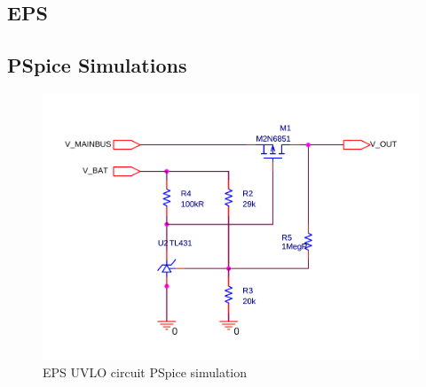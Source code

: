 \begin{appendices}
%
\section{EPS}\label{app:EPS}
%
\subsection{PSpice Simulations}
\label{app:EPS_PSpice}
%
%
\begin{figure}[H]
\centering
\includegraphics[scale=0.4]{figures/fig_CDR_PSpice_UVLO}
\caption{\ac{EPS} \ac{UVLO} circuit PSpice simulation}
\label{fig:PSpice_UVLO}
\end{figure}


\end{appendices}
